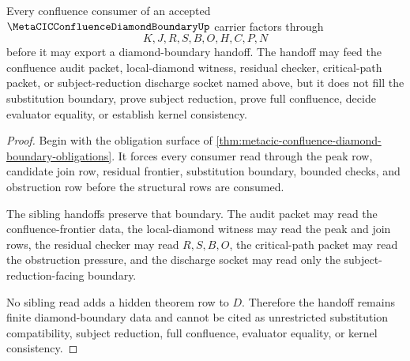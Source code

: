 \begin{theorem}
\label{thm:metacic-confluence-diamond-boundary-handoff}
Every confluence consumer of an accepted $\MetaCICConfluenceDiamondBoundaryUp$ carrier factors through
$$
K,J,R,S,B,O,H,C,P,N
$$
before it may export a diamond-boundary handoff. The handoff may feed the confluence audit packet, local-diamond witness, residual checker, critical-path packet, or subject-reduction discharge socket named above, but it does not fill the substitution boundary, prove subject reduction, prove full confluence, decide evaluator equality, or establish kernel consistency.
\end{theorem}
\begin{proof}
Begin with the obligation surface of \autoref{thm:metacic-confluence-diamond-boundary-obligations}. It forces every consumer read through the peak row, candidate join row, residual frontier, substitution boundary, bounded checks, and obstruction row before the structural rows are consumed.

The sibling handoffs preserve that boundary. The audit packet may read the confluence-frontier data, the local-diamond witness may read the peak and join rows, the residual checker may read $R,S,B,O$, the critical-path packet may read the obstruction pressure, and the discharge socket may read only the subject-reduction-facing boundary.

No sibling read adds a hidden theorem row to $D$. Therefore the handoff remains finite diamond-boundary data and cannot be cited as unrestricted substitution compatibility, subject reduction, full confluence, evaluator equality, or kernel consistency.
\end{proof}

